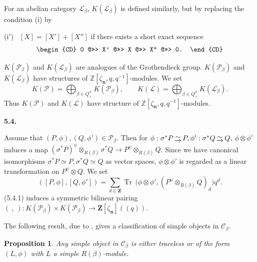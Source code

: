 \documentclass[12pt]{amsart}
\renewcommand\b{\beta}
\newcommand\z{\zeta}
\newcommand\s{\sigma}
\newcommand\f{\phi}
\renewcommand{\1}{\mathbb 1}
\newcommand{\ZZ}{\mathbb Z}
\newcommand\BZ{\mathbf Z}
\newcommand\Bn{\mathbf n}
\newcommand\SC{\mathscr{C}}
\newcommand\SL{\mathscr{L}}
\newcommand\SP{\mathscr{P}}
\newcommand\iv{^{-1}}
\newcommand\Tr{\operatorname{Tr}\,}
\newcommand{\isom}{\,\raise2pt\hbox{$\underrightarrow{\sim}$}\,}
\numberwithin{equation}{section}
\newtheorem{prop}[thm]{Proposition}
\def \para#1{\par\medskip\textbf{#1}
              \addtocounter{thm}{1}}
\begin{document}
For an abelian category $\SL_{\b}$, $K(\SL_{\b})$ is defined similarly,
but by replacing the condition (i) by
\par\medskip
(i$'$) \ $[X] = [X'] + [X'']$ if there exists a short exact sequence
\begin{equation*}
  \begin{CD}
    0 @>>>  X' @>>>  X  @>>>  X'' @>>> 0.
  \end{CD}  
\end{equation*}  
\par
$K(\SP_{\b})$ and $K(\SL_{\b})$ are analogues of the Grothendieck group. 
$K(\SP_{\b})$ and $K(\SL_{\b})$ have structures of $\ZZ[\z_{\Bn}, q, q\iv]$-modules.
We set
\begin{equation*}
  K(\SP) = \bigoplus_{\b \in Q_+^{\s}}K(\SP_{\b}), \qquad
  K(\SL) = \bigoplus_{\b \in Q_+^{\s}}K(\SL_{\b}). 
\end{equation*}  
Thus $K(\SP)$ and $K(\SL)$ have structure of $\ZZ[\z_{\Bn}, q, q\iv]$-modules.
\para{5.4.}
Assume that $(P, \f), (Q, \f') \in \SP_{\b}$. Then for
$\f: \s^*P \isom P, \f': \s^*Q \isom Q$, $\f \otimes \f'$ induces a map
$(\s^*P)^{\psi} \otimes_{R(\b)} \s^*Q \to P^{\psi}\otimes_{R(\b)} Q$. 
Since we have canonical isomorphisms $\s^*P \simeq P, \s^*Q \simeq Q$ as vector spaces,
$\f\otimes \f'$ is regarded as a linear transformation on $P^{\psi}\otimes Q$. 
We set
\begin{equation*}
\tag{5.4.1}  
  ([P,\f], [Q, \f']) = \sum_{d \in \BZ}
         \Tr\bigl(\f \otimes \f', (P^{\psi}\otimes_{R(\b)}Q)_d\bigr)q^d.
\end{equation*}
(5.4.1) induces a symmetric bilinear pairing
$(\ ,\ ) : K(\SP_{\b}) \times K(\SP_{\b}) \to \BZ[\z_{\Bn}]((q))$.

\par
The following result, due to \cite[Thm. 3.6]{M}, gives a classification
of simple objects in $\SC_{\b}$.  

\begin{prop}  %
Any simple object in $\SC_{\b}$ is either traceless or
of the form $(L, \f)$ with $L$ a simple $R(\b)$-module.
\end{prop}  
\end{document}
